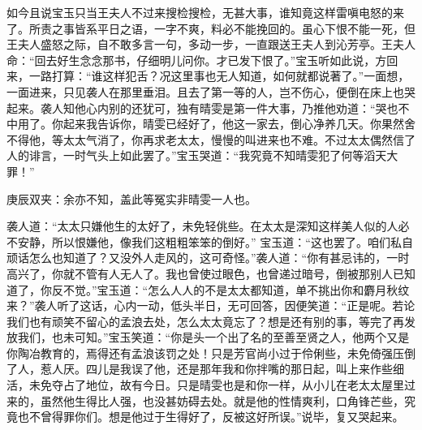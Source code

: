 \begin{parag}
    如今且说宝玉只当王夫人不过来搜检搜检，无甚大事，谁知竟这样雷嗔电怒的来了。所责之事皆系平日之语，一字不爽，料必不能挽回的。虽心下恨不能一死，但王夫人盛怒之际，自不敢多言一句，多动一步，一直跟送王夫人到沁芳亭。王夫人命：“回去好生念念那书，仔细明儿问你。才已发下恨了。”宝玉听如此说，方回来，一路打算：“谁这样犯舌？况这里事也无人知道，如何就都说著了。”一面想，一面进来，只见袭人在那里垂泪。且去了第一等的人，岂不伤心，便倒在床上也哭起来。袭人知他心内别的还犹可，独有晴雯是第一件大事，乃推他劝道：“哭也不中用了。你起来我告诉你，晴雯已经好了，他这一家去，倒心净养几天。你果然舍不得他，等太太气消了，你再求老太太，慢慢的叫进来也不难。不过太太偶然信了人的诽言，一时气头上如此罢了。”宝玉哭道：“我究竟不知晴雯犯了何等滔天大罪！”\begin{note}庚辰双夹：余亦不知，盖此等冤实非晴雯一人也。\end{note}袭人道：“太太只嫌他生的太好了，未免轻佻些。在太太是深知这样美人似的人必不安静，所以恨嫌他，像我们这粗粗笨笨的倒好。” 宝玉道：“这也罢了。咱们私自顽话怎么也知道了？又没外人走风的，这可奇怪。”袭人道：“你有甚忌讳的，一时高兴了，你就不管有人无人了。我也曾使过眼色，也曾递过暗号，倒被那别人已知道了，你反不觉。”宝玉道：“怎么人人的不是太太都知道，单不挑出你和麝月秋纹来？”袭人听了这话，心内一动，低头半日，无可回答，因便笑道：“正是呢。若论我们也有顽笑不留心的孟浪去处，怎么太太竟忘了？想是还有别的事，等完了再发放我们，也未可知。”宝玉笑道：“你是头一个出了名的至善至贤之人，他两个又是你陶冶教育的，焉得还有孟浪该罚之处！只是芳官尚小过于伶俐些，未免倚强压倒了人，惹人厌。四儿是我误了他，还是那年我和你拌嘴的那日起，叫上来作些细活，未免夺占了地位，故有今日。只是晴雯也是和你一样，从小儿在老太太屋里过来的，虽然他生得比人强，也没甚妨碍去处。就是他的性情爽利，口角锋芒些，究竟也不曾得罪你们。想是他过于生得好了，反被这好所误。”说毕，复又哭起来。
\end{parag}


